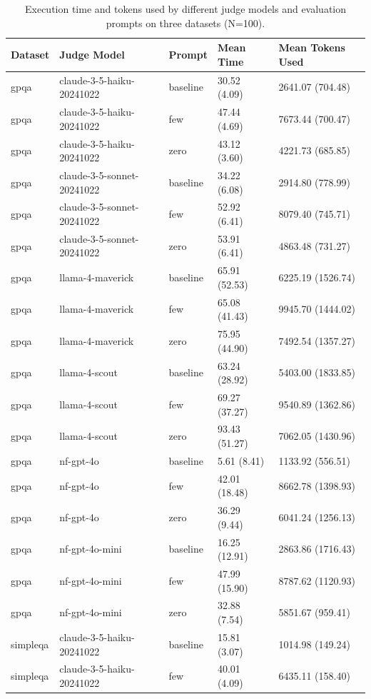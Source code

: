 \begin{table}[htbp]
\caption{Execution time and tokens used by different judge models and evaluation prompts on three datasets (N=100).}
\label{tab:expcosts}
\begin{tabular}{lllll}
\toprule
Dataset & Judge Model & Prompt & Mean Time & Mean Tokens Used \\
\midrule
gpqa & claude-3-5-haiku-20241022 & baseline &  30.52 (4.09) & 2641.07 (704.48) \\
gpqa & claude-3-5-haiku-20241022 & few &  47.44 (4.69) & 7673.44 (700.47) \\
gpqa & claude-3-5-haiku-20241022 & zero &  43.12 (3.60) & 4221.73 (685.85) \\
gpqa & claude-3-5-sonnet-20241022 & baseline &  34.22 (6.08) & 2914.80 (778.99) \\
gpqa & claude-3-5-sonnet-20241022 & few &  52.92 (6.41) & 8079.40 (745.71) \\
gpqa & claude-3-5-sonnet-20241022 & zero &  53.91 (6.41) & 4863.48 (731.27) \\
gpqa & llama-4-maverick & baseline &  65.91 (52.53) & 6225.19 (1526.74) \\
gpqa & llama-4-maverick & few &  65.08 (41.43) & 9945.70 (1444.02) \\
gpqa & llama-4-maverick & zero &  75.95 (44.90) & 7492.54 (1357.27) \\
gpqa & llama-4-scout & baseline &  63.24 (28.92) & 5403.00 (1833.85) \\
gpqa & llama-4-scout & few &  69.27 (37.27) & 9540.89 (1362.86) \\
gpqa & llama-4-scout & zero &  93.43 (51.27) & 7062.05 (1430.96) \\
gpqa & nf-gpt-4o & baseline &   5.61 (8.41) & 1133.92 (556.51) \\
gpqa & nf-gpt-4o & few &  42.01 (18.48) & 8662.78 (1398.93) \\
gpqa & nf-gpt-4o & zero &  36.29 (9.44) & 6041.24 (1256.13) \\
gpqa & nf-gpt-4o-mini & baseline &  16.25 (12.91) & 2863.86 (1716.43) \\
gpqa & nf-gpt-4o-mini & few &  47.99 (15.90) & 8787.62 (1120.93) \\
gpqa & nf-gpt-4o-mini & zero &  32.88 (7.54) & 5851.67 (959.41) \\
simpleqa & claude-3-5-haiku-20241022 & baseline &  15.81 (3.07) & 1014.98 (149.24) \\
simpleqa & claude-3-5-haiku-20241022 & few &  40.01 (4.09) & 6435.11 (158.40) \\

\end{tabular}
\end{table}
